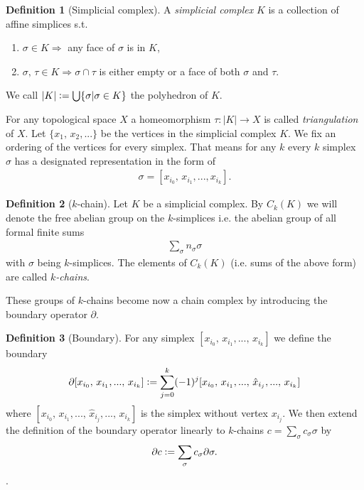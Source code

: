 \documentclass[12pt,a4paper]{article}
\theoremstyle{definition}
\newtheorem{definition}{Definition}
\begin{document}
\begin{definition}[Simplicial complex]
    A \textit{simplicial complex} $K$ is a collection of affine simplices s.t.
    \begin{enumerate}
        \item $\sigma \in K \Rightarrow$ any face of $\sigma$ is in $K$,
        \item $\sigma,\, \tau \in K \Rightarrow \sigma \cap \tau$  
                is either empty or a face of both $\sigma$ and $\tau$.
    \end{enumerate}
    We call $|K| \vcentcolon= \bigcup \{ \sigma | \sigma \in K\}$ the polyhedron of 
    $K$.
\end{definition}
For any topological space $X$ a homeomorphism 
$\tau: |K| \rightarrow X$ is called \textit{triangulation} of $X$.
Let $\{x_1,\, x_2,...\}$ be the vertices in the simplicial complex $K$.
We fix an ordering of the vertices for every simplex. 
That means for any $k$ every $k$ simplex $\sigma$ has
a designated representation in the form of
\begin{align*}
    \sigma = [x_{i_0},\, x_{i_1}, ...,x_{i_k}].
\end{align*} 

\begin{definition}[$k$-chain]
    Let $K$ be a simplicial complex. By $C_k(K)$ we will denote the 
    free abelian group on the $k$-simplices
    i.e. the abelian group of all formal finite sums
    \begin{align*}
        \sum_\sigma n_\sigma \sigma
    \end{align*}
    with $\sigma$ being $k$-simplices. The elements of $C_k(K)$
    (i.e. sums of the above form) are called \textit{$k$-chains}.
\end{definition}
These groups of $k$-chains become now a chain complex by introducing the 
boundary operator $\partial$.

\begin{definition}[Boundary]
    For any simplex $[x_{i_0},\, x_{i_1},...,\, x_{i_k}]$ we define the boundary
    \begin{align*}
        \partial[x_{i_0},\, x_{i_1},...,\, x_{i_k}] \vcentcolon=
        \sum\limits_{j=0}^k (-1)^j [x_{i_0},\, x_{i_1},...,\, 
        \hat{x}_{i_j},...,\, x_{i_k}]
    \end{align*}
    where $[x_{i_0},\, x_{i_1},...,\, \hat{x}_{i_j},...,\, x_{i_k}]$ is the
    simplex without vertex $x_{i_j}$. We then extend the definition
    of the boundary operator linearly to $k$-chains 
    $c = \sum_\sigma c_\sigma \sigma$ by
    \begin{align*}
        \partial c \vcentcolon= \sum\limits_\sigma c_\sigma \partial \sigma.
    \end{align*}.
\end{definition}
\end{document}
